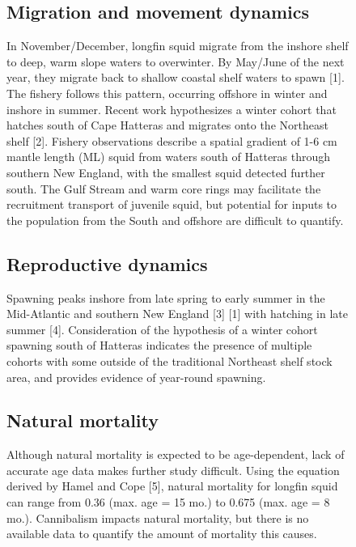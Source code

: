 \documentclass[
  9pt,
  letterpaper,
  DIV=11,
  numbers=noendperiod]{scrartcl}
\begin{document}
\begin{figure}
\begin{minipage}{0.57\linewidth}
\subsection{Migration and movement dynamics}

In November/December, longfin squid migrate from the inshore shelf to
deep, warm slope waters to overwinter. By May/June of the next year,
they migrate back to shallow coastal shelf waters to spawn {[}1{]}. The
fishery follows this pattern, occurring offshore in winter and inshore
in summer. Recent work hypothesizes a winter cohort that hatches south
of Cape Hatteras and migrates onto the Northeast shelf {[}2{]}. Fishery
observations describe a spatial gradient of 1-6 cm mantle length (ML)
squid from waters south of Hatteras through southern New England, with
the smallest squid detected further south. The Gulf Stream and warm core
rings may facilitate the recruitment transport of juvenile squid, but
potential for inputs to the population from the South and offshore are
difficult to quantify.

\vspace{0.25cm}

\subsection{Reproductive dynamics}

Spawning peaks inshore from late spring to early summer in the
Mid-Atlantic and southern New England {[}3{]} {[}1{]} with hatching in
late summer {[}4{]}. Consideration of the hypothesis of a winter cohort
spawning south of Hatteras indicates the presence of multiple cohorts
with some outside of the traditional Northeast shelf stock area, and
provides evidence of year-round spawning.

\vspace{0.25cm}

\subsection{Natural mortality}

Although natural mortality is expected to be age-dependent, lack of
accurate age data makes further study difficult. Using the equation
derived by Hamel and Cope {[}5{]}, natural mortality for longfin squid
can range from 0.36 (max. age = 15 mo.) to 0.675 (max. age = 8 mo.).
Cannibalism impacts natural mortality, but there is no available data to
quantify the amount of mortality this causes.


\end{minipage}
\end{figure}
\end{document}
